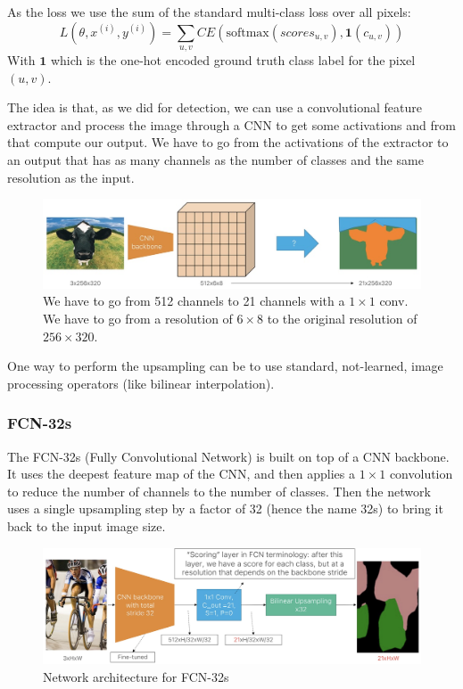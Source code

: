 As the loss we use the sum of the standard multi-class loss over all pixels:
$$L(\theta, x^{(i)}, y^{(i)}) = \sum_{u,v} CE\left(\text{softmax}(scores_{u,v}), \mathbf{1}(c_{u,v})\right)$$
With $\mathbf{1}$ which is the one-hot encoded ground truth class label for the pixel $(u,v)$.

The idea is that, as we did for detection, we can use a convolutional feature extractor and process the image through a CNN to get some activations and from that compute our output.
We have to go from the activations of the extractor to an output that has as many channels as the number of classes and the same resolution as the input.

\begin{figure}[htbp]
  \centering
  \includegraphics[width=0.7\linewidth]{./img/fcn_segmentation.jpg}
  \caption{We have to go from 512 channels to 21 channels with a $1\times 1$ conv. We have to go from a resolution of $6 \times 8$ to the original resolution of $256 \times 320$.}
\end{figure}

One way to perform the upsampling can be to use standard, not-learned, image processing operators (like bilinear interpolation).

\subsubsection{FCN-32s}
The FCN-32s (Fully Convolutional Network) is built on top of a CNN backbone.
It uses the deepest feature map of the CNN, and then applies a $1\times 1$ convolution to reduce the number of channels to the number of classes.
Then the network uses a single upsampling step by a factor of 32 (hence the name 32s) to bring it back to the input image size.

\begin{figure}[htbp]
  \centering
  \includegraphics[width=0.8\linewidth]{./img/fcn32.jpg}
  \caption{Network architecture for FCN-32s}
\end{figure}

